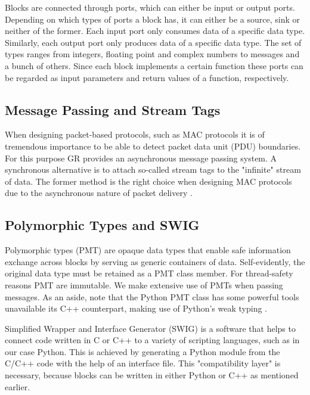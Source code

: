 Blocks are connected through ports, which can either be input or output ports. Depending on which types of ports a block has, it can either be a source, sink or neither of the former. 
Each input port only consumes data of a specific data type. Similarly, each output port only produces data of a specific data type. The set of types ranges from integers, floating point and complex numbers to messages and a bunch of others. Since each block implements a certain function these ports can be regarded as input parameters and return values of a function, respectively.

\subsection{Message Passing and Stream Tags}

When designing packet-based protocols, such as MAC protocols it is of tremendous importance to be able to detect packet data unit (PDU) boundaries. For this purpose GR provides an asynchronous message passing system. A synchronous alternative is to attach so-called stream tags to the "infinite" stream of data. The former method is the right choice when designing MAC protocols due to the asynchronous nature of packet delivery \cite{GR1}\cite{GRDocs}.  

\subsection{Polymorphic Types and SWIG} 

Polymorphic types (PMT) are opaque data types that enable safe information exchange across blocks by serving as generic containers of data. Self-evidently, the original data type must be retained as a PMT class member. For thread-safety reasons PMT are immutable. We make extensive use of PMTs when passing messages. As an aside, note that the Python PMT class has some powerful tools unavailable its C++ counterpart, making use of Python's weak typing \cite{GRDocs}.

Simplified Wrapper and Interface Generator (SWIG) is a software that helps to connect code written in C or C++ to a variety of scripting languages, such as in our case Python. This is achieved by generating a Python module from the C/C++ code with the help of an interface file. This "compatibility layer" is necessary, because blocks can be written in either Python or C++ as mentioned earlier.

